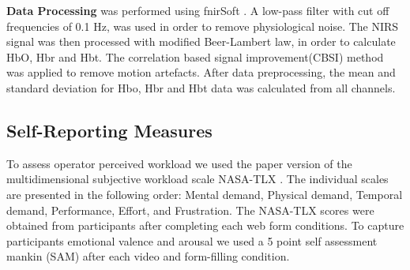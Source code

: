 \documentclass[../main/Feedback.tex]{subfiles}
\begin{document}
\textbf{Data Processing} was performed using fnirSoft \cite{ayazfunctional}. 
A low-pass filter with cut off frequencies of 0.1 Hz, was used in order to remove physiological noise.
The NIRS signal was then processed with modified Beer-Lambert law\cite{cope1988system}, in order to calculate HbO, Hbr and Hbt.  
The correlation based signal improvement(CBSI) \cite{cui2010functional} method was applied to remove motion artefacts.
After data preprocessing, the mean and standard deviation for Hbo, Hbr and Hbt data was calculated from all channels.


\subsection{Self-Reporting Measures}
To assess operator perceived workload we used the paper version of the multidimensional subjective workload scale NASA-TLX \cite{nasatlx}.
The individual scales are presented in the following order: Mental demand, Physical demand, Temporal demand, Performance, Effort, and Frustration.
The NASA-TLX scores were obtained from participants after completing each web form conditions. To capture participants emotional valence and arousal we used a 5 point self assessment mankin (SAM)\cite{bradley1994measuring} after each video and form-filling condition.  
\end{document}
